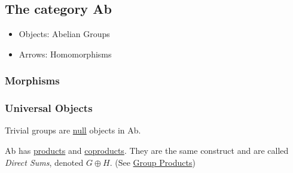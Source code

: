 \subsection{The category Ab}
\begin{itemize}
  \item Objects: Abelian Groups
  \item Arrows: Homomorphisms
\end{itemize}

\subsubsection{Morphisms}

\subsubsection{Universal Objects}

\begin{proposition}
Trivial groups are \hyperref[null]{null} objects in Ab.
\end{proposition}

\begin{proposition}
Ab has \hyperref[products]{products} and \hyperref[coproducts]{coproducts}. They are the same
construct and are called \emph{Direct Sums}, denoted $G \oplus H$. (See \hyperref[groupproduct]{Group Products})
\end{proposition}